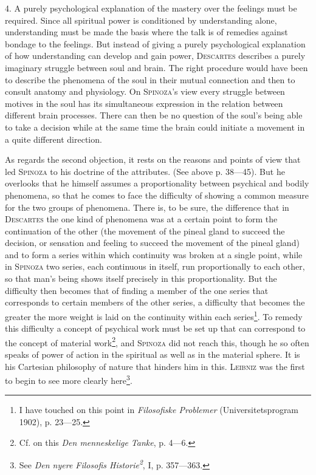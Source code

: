 \documentclass[12pt]{article}
\newcommand{\opage}[1]{\marginnote{\footnotesize\textit{[#1]}}}
\begin{document}
4. A purely psychological explanation of the mastery over the feelings must be required. Since all
spiritual power is conditioned by understanding alone, understanding must be made the basis where
the talk is of remedies against bondage to the feelings. But instead of giving a purely
psychological explanation of how understanding can develop and gain power, \textsc{Descartes}
describes a purely imaginary struggle between soul and brain. The right procedure would have been
to describe the phenomena of the soul in their mutual connection and then to consult anatomy and
physiology. On \textsc{Spinoza}'s view every struggle between motives in the soul has its
simultaneous expression in the relation between different brain processes. There can then be no
question of the soul's being able to take a decision while at the same time the brain could
initiate a movement in a quite different direction. %

As regards the second objection, it rests on the reasons and points of view that led
\textsc{Spinoza} to his doctrine of the attributes. (See above p. 38---45). But he overlooks that he
himself assumes a proportionality between psychical and bodily phenomena, so that he comes to face
the difficulty of showing a common measure for the two groups of phenomena. There is, to be sure,
the difference that in \textsc{Descartes} \opage{86}the one kind of phenomena was at a certain point
to form the continuation of the other (the movement of the pineal gland to succeed the decision, or
sensation and feeling to succeed the movement of the pineal gland) and to form a series within
which continuity was broken at a single point, while in \textsc{Spinoza} two series, each
continuous in itself, run proportionally to each other, so that man's being shows itself precisely
in this proportionality. But the difficulty then becomes that of finding a member of the one series
that corresponds to certain members of the other series, a difficulty that becomes the greater the
more weight is laid on the continuity within each series\footnote{I have touched on this point in
\textit{Filosofiske Problemer} (Universitetsprogram 1902), p. 23---25.}. To remedy this difficulty a
concept of psychical work must be set up that can correspond to the concept of material
work\footnote{Cf. on this \textit{Den menneskelige Tanke}, p. 4---6.}, and \textsc{Spinoza} did not
reach this, though he so often speaks of power of action in the spiritual as well as in the
material sphere. It is his Cartesian philosophy of nature that hinders him in this.
\textsc{Leibniz} was the first to begin to see more clearly here\footnote{See \textit{Den nyere
Filosofis Historie\textsuperscript{2}}, I, p. 357---363.}.
\end{document}

